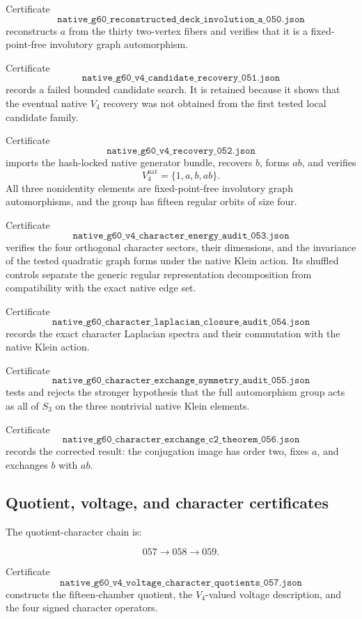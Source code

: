 Certificate
\[
\texttt{native\_g60\_reconstructed\_deck\_involution\_a\_050.json}
\]
reconstructs \(a\) from the thirty two-vertex fibers and verifies that
it is a fixed-point-free involutory graph automorphism.

Certificate
\[
\texttt{native\_g60\_v4\_candidate\_recovery\_051.json}
\]
records a failed bounded candidate search. It is retained because it
shows that the eventual native \(V_4\) recovery was not obtained from
the first tested local candidate family.

Certificate
\[
\texttt{native\_g60\_v4\_recovery\_052.json}
\]
imports the hash-locked native generator bundle, recovers \(b\), forms
\(ab\), and verifies
\[
V_4^{\mathrm{nat}}=\{1,a,b,ab\}.
\]
All three nonidentity elements are fixed-point-free involutory graph
automorphisms, and the group has fifteen regular orbits of size four.

Certificate
\[
\texttt{native\_g60\_v4\_character\_energy\_audit\_053.json}
\]
verifies the four orthogonal character sectors, their dimensions, and
the invariance of the tested quadratic graph forms under the native
Klein action. Its shuffled controls separate the generic regular
representation decomposition from compatibility with the exact native
edge set.

Certificate
\[
\texttt{native\_g60\_character\_laplacian\_closure\_audit\_054.json}
\]
records the exact character Laplacian spectra and their commutation
with the native Klein action.

Certificate
\[
\texttt{native\_g60\_character\_exchange\_symmetry\_audit\_055.json}
\]
tests and rejects the stronger hypothesis that the full automorphism
group acts as all of \(S_3\) on the three nontrivial native Klein
elements.

Certificate
\[
\texttt{native\_g60\_character\_exchange\_c2\_theorem\_056.json}
\]
records the corrected result: the conjugation image has order two,
fixes \(a\), and exchanges \(b\) with \(ab\).

\subsection{Quotient, voltage, and character certificates}

The quotient-character chain is:

\[
057
\longrightarrow
058
\longrightarrow
059.
\]

Certificate
\[
\texttt{native\_g60\_v4\_voltage\_character\_quotients\_057.json}
\]
constructs the fifteen-chamber quotient, the \(V_4\)-valued voltage
description, and the four signed character operators.

